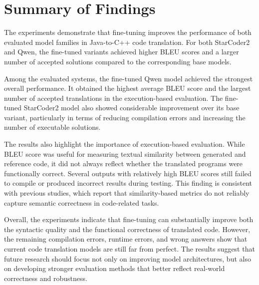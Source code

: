 \section{Summary of Findings}


The experiments demonstrate that fine-tuning improves the performance of both
evaluated model families in Java-to-C++ code translation. For both StarCoder2
and Qwen, the fine-tuned variants achieved higher BLEU scores and a larger
number of accepted solutions compared to the corresponding base models.

Among the evaluated systems, the fine-tuned Qwen model achieved the strongest
overall performance. It obtained the highest average BLEU score and the largest
number of accepted translations in the execution-based evaluation. The
fine-tuned StarCoder2 model also showed considerable improvement over its base
variant, particularly in terms of reducing compilation errors and increasing the
number of executable solutions.

The results also highlight the importance of execution-based evaluation. While
BLEU score was useful for measuring textual similarity between generated and
reference code, it did not always reflect whether the translated programs were
functionally correct. Several outputs with relatively high BLEU scores still
failed to compile or produced incorrect results during testing. This finding is
consistent with previous studies, which report that similarity-based metrics do
not reliably capture semantic correctness in code-related tasks.

Overall, the experiments indicate that fine-tuning can substantially improve
both the syntactic quality and the functional correctness of translated code.
However, the remaining compilation errors, runtime errors, and wrong answers
show that current code translation models are still far from perfect. The
results suggest that future research should focus not only on improving model
architectures, but also on developing stronger evaluation methods that better
reflect real-world correctness and robustness.